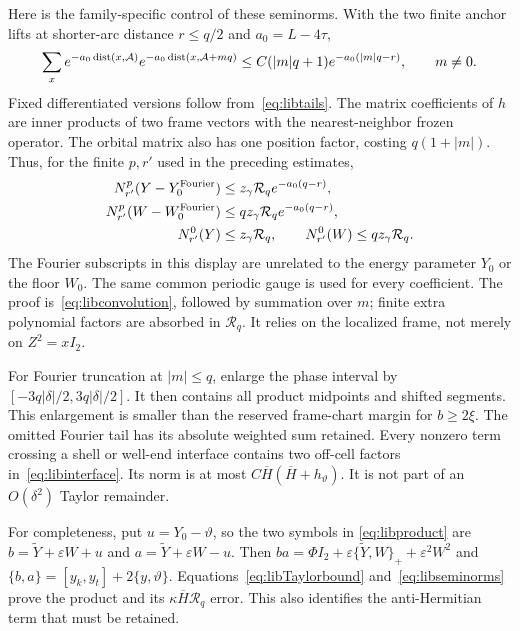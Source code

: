 Here is the family-specific control of these seminorms.
With the two finite anchor lifts at shorter-arc distance $r\le q/2$
and $a_0=L-4\tau$,
\begin{equation}\label{eq:libconvolution}
 \sum_x e^{-a_0\operatorname{dist}(x,\mathcal A)}
        e^{-a_0\operatorname{dist}(x,\mathcal A+mq)}
 \le C(|m|q+1)e^{-a_0(|m|q-r)},\qquad m\ne0.
\end{equation}
Fixed differentiated versions follow from~\eqref{eq:libtails}.
The matrix coefficients of $h$ are inner products of two frame
vectors with the nearest-neighbor frozen operator. The orbital
matrix also has one position factor, costing $q(1+|m|)$.
Thus, for the finite $p,r'$ used in the preceding estimates,
\begin{align}
 N_{r'}^p(Y-Y_0^{\rm Fourier})
       &\le z_\gamma\mathcal R_qe^{-a_0(q-r)},\\
 N_{r'}^p(W-W_0^{\rm Fourier})
       &\le qz_\gamma\mathcal R_qe^{-a_0(q-r)},\\
 N_{r'}^0(Y)&\le z_\gamma\mathcal R_q,\qquad
 N_{r'}^0(W)\le qz_\gamma\mathcal R_q.\label{eq:libseminorms}
\end{align}
The Fourier subscripts in this display are unrelated to the energy
parameter $Y_0$ or the floor $W_0$.
The same common periodic gauge is used for every coefficient.
The proof is~\eqref{eq:libconvolution}, followed by summation over
$m$; finite extra polynomial factors are absorbed in $\mathcal R_q$.
It relies on the localized frame, not merely on $Z^2=xI_2$.

For Fourier truncation at $|m|\le q$, enlarge the phase interval by
$[-3q|\delta|/2,3q|\delta|/2]$. It then contains all product
midpoints and shifted segments. This enlargement is smaller than
the reserved frame-chart margin for $b\ge2\xi$.
The omitted Fourier tail has its absolute weighted sum retained.
Every nonzero term crossing a shell or well-end interface contains
two off-cell factors in~\eqref{eq:libinterface}. Its norm is at most
$C\overline H(\overline H+h_\vartheta)$.
It is not part of an $O(\delta^2)$ Taylor remainder.

For completeness, put $u=Y_0-\vartheta$, so the two symbols in
\eqref{eq:libproduct} are $b=\widetilde Y+\varepsilon W+u$ and
$a=\widetilde Y+\varepsilon W-u$.
Then $ba=\Phi I_2+\varepsilon\{\widetilde Y,W\}_+
+\varepsilon^2W^2$ and
$\{b,a\}=[y_k,y_t]+2\{y,\vartheta\}$.
Equations~\eqref{eq:libTaylorbound} and~\eqref{eq:libseminorms}
prove the product and its $\kappa\overline H\mathcal R_q$ error.
This also identifies the anti-Hermitian term that must be retained.

